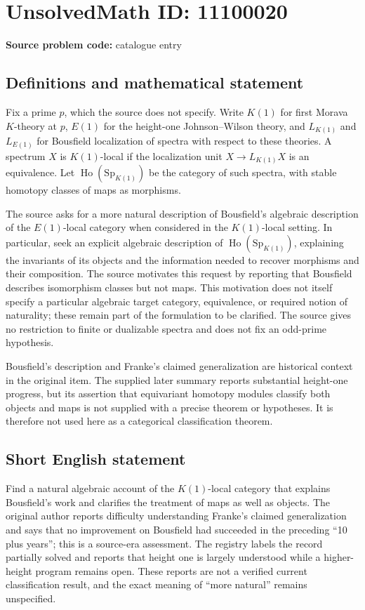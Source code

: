 \documentclass[11pt]{article}
\begin{document}
\section*{UnsolvedMath ID: 11100020}
\textbf{Source problem code:} catalogue entry
\subsection{Definitions and mathematical statement}
Fix a prime $p$, which the source does not specify. Write $K(1)$ for first Morava $K$-theory at $p$, $E(1)$ for the height-one Johnson--Wilson theory, and $L_{K(1)}$ and $L_{E(1)}$ for Bousfield localization of spectra with respect to these theories. A spectrum $X$ is $K(1)$-local if the localization unit $X\to L_{K(1)}X$ is an equivalence. Let $\operatorname{Ho}(\mathrm{Sp}_{K(1)})$ be the category of such spectra, with stable homotopy classes of maps as morphisms.

The source asks for a more natural description of Bousfield's algebraic description of the $E(1)$-local category when considered in the $K(1)$-local setting. In particular, seek an explicit algebraic description of $\operatorname{Ho}(\mathrm{Sp}_{K(1)})$, explaining the invariants of its objects and the information needed to recover morphisms and their composition. The source motivates this request by reporting that Bousfield describes isomorphism classes but not maps. This motivation does not itself specify a particular algebraic target category, equivalence, or required notion of naturality; these remain part of the formulation to be clarified. The source gives no restriction to finite or dualizable spectra and does not fix an odd-prime hypothesis.

Bousfield's description and Franke's claimed generalization are historical context in the original item. The supplied later summary reports substantial height-one progress, but its assertion that equivariant homotopy modules classify both objects and maps is not supplied with a precise theorem or hypotheses. It is therefore not used here as a categorical classification theorem.
\subsection{Short English statement}
Find a natural algebraic account of the $K(1)$-local category that explains Bousfield's work and clarifies the treatment of maps as well as objects. The original author reports difficulty understanding Franke's claimed generalization and says that no improvement on Bousfield had succeeded in the preceding ``10 plus years''; this is a source-era assessment. The registry labels the record partially solved and reports that height one is largely understood while a higher-height program remains open. These reports are not a verified current classification result, and the exact meaning of ``more natural'' remains unspecified.
\end{document}
